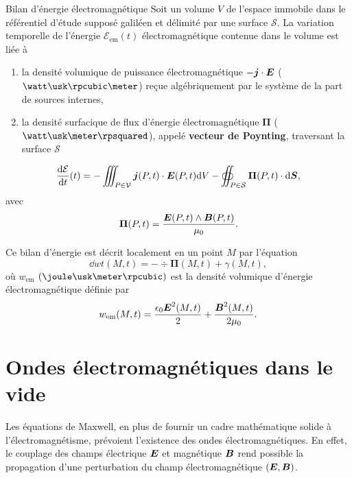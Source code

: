 \begin{defn}{Bilan d'énergie électromagnétique}
	Soit un volume $V$ de l'espace immobile dans le référentiel d'étude supposé
	galiléen et délimité par une surface $\mathcal{S}$. La variation 
	temporelle de l'énergie $\mathcal{E}_\mathrm{em}(t)$ électromagnétique
	contenue dans le volume est liée à
	\begin{enumerate}
	\item la densité volumique de puissance électromagnétique
		$- \vecj \cdot \vece$ ($\watt \usk \rpcubic \meter$) 
	  reçue algébriquement par le système de la part de sources internes,
	
	\item la densité surfacique de flux d'énergie électromagnétique $\mathbf{\Pi}$
		($\watt \usk \meter \rpsquared$),
  	  appelé \textbf{vecteur de Poynting}, traversant la surface $\mathcal{S}$
	\end{enumerate}
	
	\begin{equation}
		\dn{\mathcal{E}}{t}(t) = - \iiint_{P \in \mathcal{V}} 
		\vecj(P, t) \cdot \vece(P, t) \dV 
		- \oiint_{P \in \mathcal{S}} \mathbf{\Pi}(P, t) \cdot \ds,
	\end{equation}
	avec
	\begin{equation}
		\mathbf{\Pi}(P, t) = \dfrac{\vece(P, t) \wedge \vecb(P, t)}{\mu_0}.
	\end{equation}

	Ce bilan d'énergie est décrit localement en un point $M$
	par l'équation
	\begin{equation}
		\dd{w}{t}(M, t) = -\div \mathbf{\Pi}(M, t) + \gamma(M, t),
	\end{equation}
	où $w_\mathrm{em}$ $(\joule \usk \meter \rpcubic)$ 
	est la densité volumique d'énergie électromagnétique définie par
	\begin{equation}
		w_\mathrm{em}(M, t) = \dfrac{\epsilon_0 \vece^2(M, t)}{2} 
		+ \dfrac{\vecb^2(M, t)}{2 \mu_0}.
	\end{equation}
\end{defn}

\section{Ondes électromagnétiques dans le vide}
Les équations de Maxwell, en plus de fournir un cadre mathématique solide 
à l'électromagnétisme, prévoient l'existence des ondes électromagnétiques. 
En effet, le couplage des champs électrique $\vece$ et magnétique $\vecb$ 
rend possible la propagation d'une perturbation du champ électromagnétique
$(\vece, \vecb)$. 

